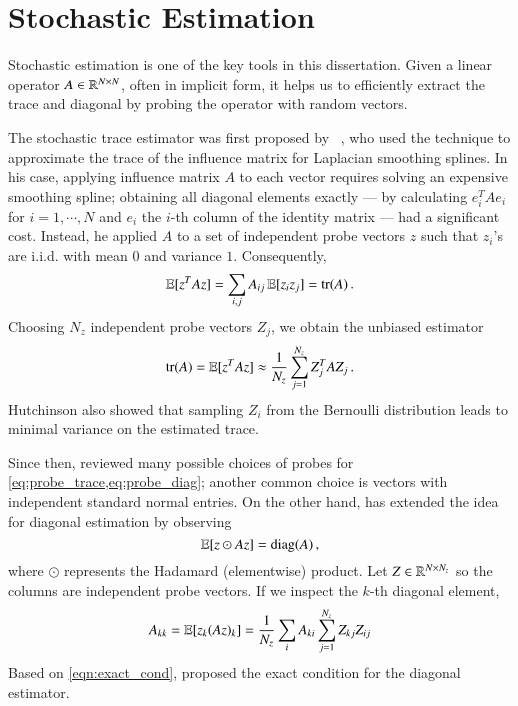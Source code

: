 \section{Stochastic Estimation}\label{pre:ste}

Stochastic estimation is one of the key tools in this dissertation. Given a
linear operator $A\in\mathbb{R}^{N\mathbin{\times} N}$, often in implicit form, it helps us to
efficiently extract the trace and diagonal by probing the operator with random
vectors. 

The stochastic trace estimator was first proposed by~
\citet{hutchinson1990stochastic}, who used the technique to approximate the
trace of the influence matrix for Laplacian smoothing splines. In his case,
applying influence matrix $A$ to each vector requires solving an expensive
smoothing spline; obtaining all diagonal elements exactly --- by calculating
$e_i^TAe_i$ for $i=1,\cdots, N$ and $e_i$ the $i$\hyp{}th column of the identity
matrix --- had a significant cost. Instead, he applied $A$ to a set of
independent probe vectors $z$ such that $z_i$'s are i.i.d. with mean $0$ and
variance $1$. Consequently, 
\begin{equation}\label{eq:probe_trace}
	\operatorname{\mathbb{E}}[z^TAz] = \sum_{i,j}A_{ij}\operatorname{\mathbb{E}}[z_iz_j] = \operatorname{tr}(A)\,.
\end{equation}
Choosing $N_z$ independent probe vectors $Z_j$, we obtain the unbiased estimator
\begin{equation}\label{eqn:trace_est}
	\operatorname{tr}(A) = \operatorname{\mathbb{E}}[z^TAz] \approx \frac{1}{N_z}\sum_{j=1}^{N_z}Z_j^TAZ_j\,.
\end{equation}
Hutchinson also showed that sampling $Z_i$ from the Bernoulli distribution
leads to minimal variance on the estimated trace.

Since then, \citet{avron2011randomized} reviewed many possible choices of probes
for \cref{eq:probe_trace,eq:probe_diag}; another common choice is vectors with
independent standard normal entries. On the other hand,  
\citet{bekas2007estimator} has extended the idea for diagonal estimation by
observing
\begin{equation}\label{eq:probe_diag}
	\operatorname{\mathbb{E}}[z\odot Az] = \operatorname{diag}(A)\,,
\end{equation}
where $\odot$ represents the Hadamard (elementwise) product. Let $Z\in\mathbb{R}^
{N\mathbin{\times} N_z}$ so the columns are independent probe vectors. If we inspect the
$k$\hyp{}th diagonal element,
\begin{equation}\label{eqn:exact_cond}
	A_{kk} = \operatorname{\mathbb{E}}[z_k(Az)_k] = \frac{1}{N_z}\sum_{i}A_{ki}\sum_{j=1}^{N_z}Z_{kj}Z_
	{ij}
\end{equation}
Based on \cref{eqn:exact_cond}, \citet{bekas2007estimator} proposed the exact
condition for the diagonal estimator.

